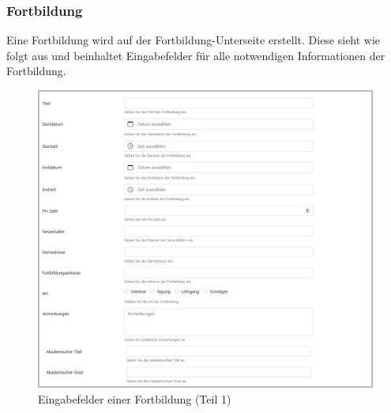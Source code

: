 \subsubsection{Fortbildung}
Eine Fortbildung wird auf der Fortbildung-Unterseite erstellt. Diese sieht wie folgt aus und beinhaltet Eingabefelder für alle notwendigen Informationen der Fortbildung.
\begin{figure}[H]
	\centering
	\includegraphics[width=1\linewidth]{images/rfoster_implementierung/workshop1}
	\caption[Fortbildungsinformationen eingeben (Teil 1)]{Eingabefelder einer Fortbildung (Teil 1)}
	\label{fig:workshop1}
\end{figure}
